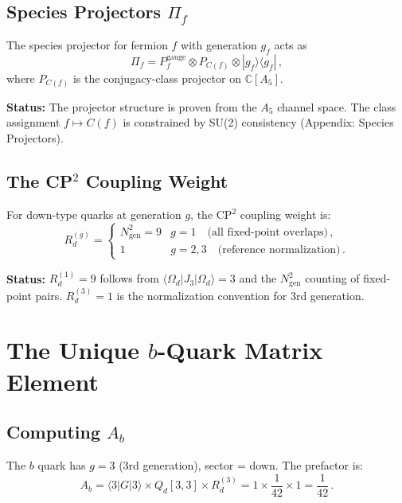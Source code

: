 \documentclass[11pt,a4paper]{article}
\newcommand{\C}{\mathbb{C}}
\theoremstyle{definition}
\theoremstyle{remark}
\begin{document}
\subsection{Species Projectors $\Pi_f$}

The species projector for fermion $f$ with generation $g_f$ acts as
\begin{equation}
\Pi_f = P_f^{\text{gauge}} \otimes P_{C(f)} \otimes |g_f\rangle\langle g_f|\,,
\end{equation}
where $P_{C(f)}$ is the conjugacy-class projector on $\C[A_5]$.

\noindent
\textbf{Status:}  {\color{proven}The projector structure is proven from
the $A_5$ channel space.}  The class assignment $f \mapsto C(f)$ is
constrained by SU(2) consistency (Appendix: Species Projectors).

\subsection{The CP$^2$ Coupling Weight}

For down-type quarks at generation $g$, the CP$^2$ coupling weight is:
\begin{equation}
R_d^{(g)} = \begin{cases}
  N_{\text{gen}}^2 = 9 & g = 1 \quad \text{(all fixed-point overlaps)}\,,\\
  1 & g = 2, 3 \quad \text{(reference normalization)}\,.
\end{cases}
\end{equation}

\noindent
\textbf{Status:}  {\color{proven}$R_d^{(1)} = 9$ follows from
$\langle\Omega_d|J_3|\Omega_d\rangle = 3$ and the $N_{\text{gen}}^2$
counting of fixed-point pairs.  $R_d^{(3)} = 1$ is the normalization
convention for 3rd generation.}

\section{The Unique $b$-Quark Matrix Element}
\label{sec:unique}

\subsection{Computing $A_b$}

The $b$ quark has $g = 3$ (3rd generation), sector = down.  The prefactor is:
\begin{equation}
\boxed{A_b = \langle 3| G |3\rangle \times Q_d[3,3] \times R_d^{(3)}
     = 1 \times \frac{1}{42} \times 1 = \frac{1}{42}\,.}
\end{equation}
\end{document}
